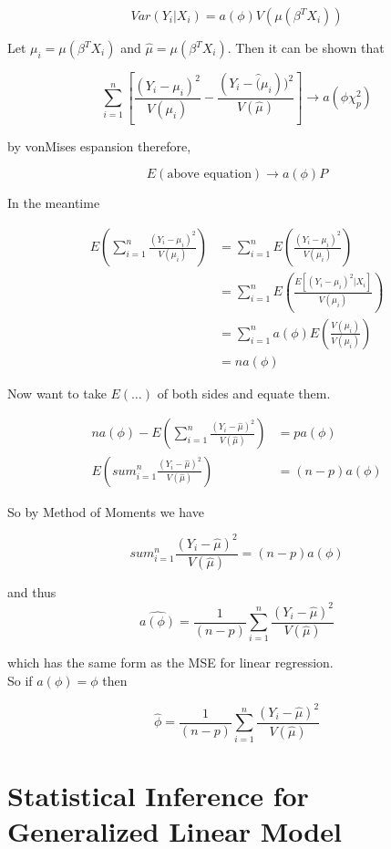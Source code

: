 \documentclass[11pt,fleqn]{book} %
\begin{document}
		$$Var(Y_i|X_i) = a(\phi)V(\mu(\beta^T X_i)) $$

Let $\mu_i = \mu(\beta^T X_i)$ and $\hat{\mu} = \mu(\beta^T X_i)$. Then it can be shown that

		$$\sum^n_{i=1} \left[\frac{(Y_i -\mu_i)^2}{V(\mu_i)} - \frac{(Y_i - \hat(\mu_i))^2}{V(\hat{\mu})} \right] \rightarrow a(\phi \chi^2_p) $$

by vonMises espansion therefore, 
	
		$$E(\text{above equation}) \rightarrow a(\phi)P $$

In the meantime
		
		\begin{align*}
			E\left(\sum^n_{i=1} \frac{(Y_i - \mu_i)^2}{V(\mu_i)} \right) &= \sum^n_{i=1} E\left( \frac{(Y_i - \mu_i)^2}{V(\mu_i)} \right)\\
					&= \sum^n_{i=1} E\left( \frac{E[(Y_i - \mu_i)^2|X_i]}{V(\mu_i)} \right)\\
					&= \sum^n_{i=1} a(\phi) E(\frac{V(\mu_i)}{V(\mu_i)})\\
					&= n a(\phi)
		\end{align*}

Now want to take $E(\dots)$ of both sides and equate them. 

		\begin{align*}
			n a(\phi) - E(\sum^n_{i=1} \frac{(Y_i - \hat{\mu})^2}{V(\hat{\mu})}) &= p a(\phi)\\
			 E(sum^n_{i=1} \frac{(Y_i - \hat{\mu})^2}{V(\hat{\mu})}) &= (n-p) a(\phi)
		\end{align*}

So by Method of Moments we have

		$$ 	sum^n_{i=1} \frac{(Y_i - \hat{\mu})^2}{V(\hat{\mu})} = (n-p) a(\phi)$$

and thus 
		$$\hat{a(\phi)} = \frac{1}{(n-p)} \sum^n_{i=1} \frac{(Y_i - \hat{\mu})^2}{V(\hat{\mu})} $$

which has the same form as the MSE for linear regression. \\

So if $a(\phi) = \phi$ then 

		$$\hat{\phi} =   \frac{1}{(n-p)} \sum^n_{i=1} \frac{(Y_i - \hat{\mu})^2}{V(\hat{\mu})}$$


\section{Statistical Inference for Generalized Linear Model}
\end{document}
